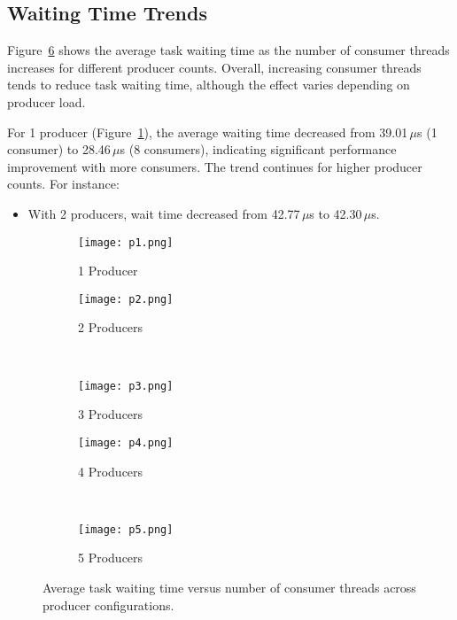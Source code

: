 \documentclass{article}
\begin{document}
\subsection{Waiting Time Trends}
Figure~\ref{fig:results} shows the average task waiting time as the number of consumer threads increases for different producer counts. Overall, increasing consumer threads tends to reduce task waiting time, although the effect varies depending on producer load.

For 1 producer (Figure~\ref{fig:prod1}), the average waiting time decreased from 39.01\,$\mu$s (1 consumer) to 28.46\,$\mu$s (8 consumers), indicating significant performance improvement with more consumers. The trend continues for higher producer counts. For instance:
\begin{itemize}
    \item With 2 producers, wait time decreased from 42.77\,$\mu$s to 42.30\,$\mu$s.
\end{itemize}

\begin{figure}[ht]
    \centering
    \begin{subfigure}[b]{0.45\textwidth}
        \texttt{[image: p1.png]}
        \caption{1 Producer}
        \label{fig:prod1}
    \end{subfigure}
    \begin{subfigure}[b]{0.45\textwidth}
        \texttt{[image: p2.png]}
        \caption{2 Producers}
        \label{fig:prod2}
    \end{subfigure}
    \\
    \begin{subfigure}[b]{0.45\textwidth}
        \texttt{[image: p3.png]}
        \caption{3 Producers}
        \label{fig:prod3}
    \end{subfigure}
    \begin{subfigure}[b]{0.45\textwidth}
        \texttt{[image: p4.png]}
        \caption{4 Producers}
        \label{fig:prod4}
    \end{subfigure}
    \\
    \begin{subfigure}[b]{0.45\textwidth}
        \texttt{[image: p5.png]}
        \caption{5 Producers}
        \label{fig:prod5}
    \end{subfigure}
    \caption{Average task waiting time versus number of consumer threads across producer configurations.}
    \label{fig:results}
\end{figure}
\end{document}
